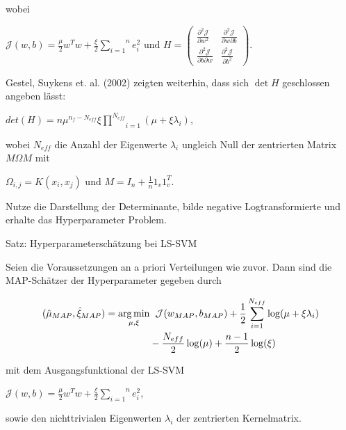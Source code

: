 \documentclass{beamer}
\begin{document}
{\begin{frame}
wobei 
\begin{center}
	$\mathcal{J}(w,b) = \frac{\mu}{2}w^T w + \frac{\xi}{2}\overset{n}{\underset{i=1}			{\sum}} e_i ^2 \text{ und } H = \begin{pmatrix}
	\frac{\partial^2 \mathcal{J}}{\partial w^2 } & \frac{\partial^2 \mathcal{J}}				{\partial w \partial b } \\
	\frac{\partial^2 \mathcal{J}}{\partial b \partial w } & \frac{\partial^2 					\mathcal{J}}{\partial b^2 }
	\end{pmatrix}.$
\end{center}
\end{frame}


\begin{frame}

Gestel, Suykens et. al. (2002) zeigten weiterhin, dass sich $\det H $ geschlossen angeben lässt:

\begin{center}
$det(H) = n \mu^{n_f - N_{eff}} \xi \underset{i=1}{\overset{N_{eff}}{\prod}}(\mu + \xi \lambda_i)$,
\end{center}

wobei $N_{eff}$ die Anzahl der Eigenwerte $\lambda_i$ ungleich Null der zentrierten Matrix $M \Omega M$ mit
\begin{center}
$\Omega_{i,j} = K(x_i, x_j)$ und $M = I_n + \frac{1}{n} 1_v 1_v^T$.
\end{center}
Nutze die Darstellung der Determinante, bilde negative Logtransformierte und erhalte das Hyperparameter Problem.
\end{frame}


\begin{frame}
\begin{block}{Satz: Hyperparameterschätzung bei LS-SVM}

Seien die Voraussetzungen an a priori Verteilungen wie zuvor. Dann sind die MAP-Schätzer der Hyperparameter gegeben durch

\begin{align}
(\hat{\mu}_{MAP}, \hat{\xi}_{MAP}) = \underset{\mu, \xi}{\arg \min} & \hspace{0.2cm}\mathcal{J}(w_{MAP}, b_{MAP}) + \frac{1}{2}\sum_{i=1}^{N_{eff}}\log(\mu + \xi \lambda_i) \\
&- \frac{N_{eff}}{2}\log(\mu) + \frac{n -1 }{2}\log(\xi)
\end{align}



mit dem Ausgangsfunktional der LS-SVM 
\begin{center}
$\mathcal{J}(w,b) = \frac{\mu}{2}w^T w + \frac{\xi}{2}\overset{n}{\underset{i=1}{\sum}} e_i ^2$,
\end{center}
sowie den nichttrivialen Eigenwerten $\lambda_i$ der zentrierten Kernelmatrix.
\end{block}


\end{frame}}
\end{document}
